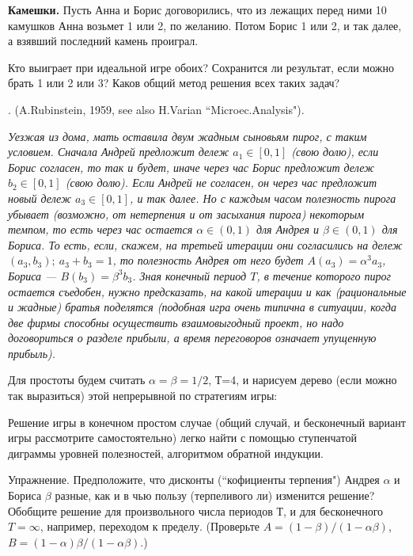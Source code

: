 \documentclass[a4paper,12pt]{article}
\begin{document}
\begin{exmp}\rm
{\bf Камешки.} {\em } Пусть Анна и Борис договорились, что
из лежащих перед ними 10 камушков Анна возьмет 1 или 2, по
желанию. Потом Борис 1 или 2, и так далее, а взявший
последний камень проиграл.

Кто выиграет при идеальной игре обоих? Сохранится ли
результат, если можно брать 1 или 2 или 3? Каков общий
метод решения всех таких задач?
\end{exmp}


\begin{exmp}
.\newline
(A.Rubinstein, 1959, see also H.Varian
``Microec.Analysis").\newline
 {\em
Уезжая из дома, мать оставила двум жадным сыновьям пирог, с
таким условием. Сначала Андрей предложит дележ $a_1\in
[0,1]$ (свою долю), если Борис согласен, то так и будет,
иначе через час Борис предложит дележ $b_2\in [0,1]$ (свою
долю). Если Андрей не согласен, он через час предложит
новый дележ $a_3\in [0,1]$, и так далее. Но с каждым часом
полезность пирога убывает (возможно, от нетерпения и от
засыхания пирога) некоторым темпом, то есть через час
остается $\alpha\in (0,1)$ для Андрея и $\beta\in (0,1)$
для Бориса. То есть, если, скажем, на третьей итерации они
согласились на дележ $(a_3, b_3); ~ a_3+ b_3=1$, то
полезность Андрея от него будет $A(a_3)=\alpha^3 a_3$,
Бориса
--- $B(b_3)=\beta^3 b_3$. Зная конечный период $T$, в течение
которого пирог остается съедобен, нужно предсказать, на
какой итерации и как (рациональные и жадные) братья
поделятся (подобная игра очень типична в ситуации, когда
две фирмы способны осуществить взаимовыгодный проект, но
надо договориться о разделе прибыли, а время переговоров
означает упущенную прибыль).

Для простоты будем считать $\alpha = \beta =1/2$, Т=4, и
нарисуем дерево (если можно так выразиться) этой
непрерывной по стратегиям игры:

Решение игры в конечном простом случае (общий случай, и
бесконечный вариант игры рассмотрите самостоятельно) легко
найти с помощью ступенчатой диграммы уровней полезностей,
алгоритмом обратной индукции.

Упражнение. Предположите, что дисконты (``кофициенты
терпения") Андрея $\alpha$ и Бориса $\beta$ разные, как и в
чью пользу (терпеливого ли) изменится решение? Обобщите
решение для произвольного числа периодов Т, и для
бесконечного $T=\infty$, например, переходом к пределу.
(Проверьте $A=(1-\beta)/(1-\alpha\beta)$,
$B=(1-\alpha)\beta/(1-\alpha\beta)$.)}
\end{exmp}
\end{document}
